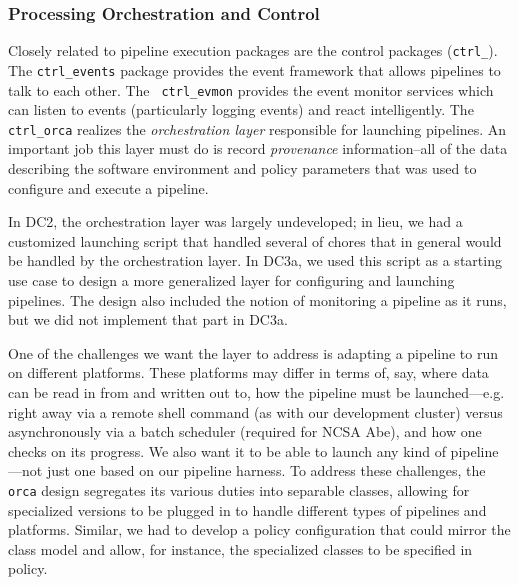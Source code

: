 
\subsubsection{Processing Orchestration and Control}

Closely related to pipeline execution packages are the control
packages ({\tt ctrl\_}).  The {\tt ctrl\_events} package provides the
event framework that allows pipelines to talk to each other.  The {\tt
ctrl\_evmon} provides the event monitor services which can listen to
events (particularly logging events) and react intelligently.  The
{\tt ctrl\_orca} realizes the {\it orchestration layer} responsible
for launching pipelines.  An important job this layer must do is
record {\it provenance} information--all of the data describing the
software environment and policy parameters that was used to configure
and execute a pipeline.  

\label{sec:PipelineOrchestration}

In DC2, the orchestration layer was largely undeveloped; in lieu, we
had a customized launching script that handled several of chores that
in general would be handled by the orchestration layer.  In DC3a, we
used this script as a starting use case to design a more generalized
layer for configuring and launching pipelines.  The design also
included the notion of monitoring a pipeline as it runs, but we did
not implement that part in DC3a.  

One of the challenges we want the layer to address is adapting a
pipeline to run on different platforms.  These platforms may differ in
terms of, say, where data can be read in from and written out to, how
the pipeline must be launched---e.g. right away via a remote shell
command (as with our development cluster) versus asynchronously via a
batch scheduler (required for NCSA Abe), and how one checks on its
progress.  We also want it to be able to launch any kind of
pipeline---not just one based on our pipeline harness.  To address
these challenges, the {\tt orca} design segregates its various duties
into separable classes, allowing for specialized versions to be
plugged in to handle different types of pipelines and platforms.
Similar, we had to develop a policy configuration that could mirror
the class model and allow, for instance, the specialized classes to be
specified in policy.  


